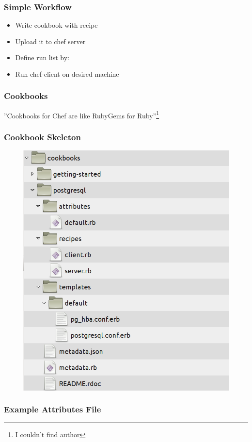 \documentclass[16pt]{beamer}
\begin{document}
\begin{frame}
  \frametitle{Simple Workflow}
  \begin{itemize}
    \item Write cookbook with recipe
    \item Upload it to chef server
    \item Define run list by:
    \item Run chef-client on desired machine
  \end{itemize}
\end{frame}

\begin{frame}
  \frametitle{Cookbooks}
  \begin{center}
    \LARGE ''Cookbooks for Chef are like RubyGems for Ruby''\footnote{I couldn't find author}
  \end{center}
\end{frame}

\begin{frame}
  \frametitle{Cookbook Skeleton}
  \begin{figure}
    \includegraphics[width=0.6\linewidth]{images/cookbook-skeleton}
  \end{figure}
\end{frame}

\begin{frame}
  \frametitle{Example Attributes File}
  \begin{footnotesize}
    
    \label{postgres_attributes}
  \end{footnotesize}
\end{frame}
\end{document}
